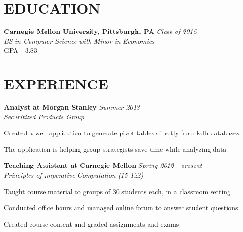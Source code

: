 \documentclass[margin, 11pt]{res} %
\begin{document}
\begin{resume}


\section{EDUCATION}

{\bf Carnegie Mellon University, Pittsburgh, PA} \hfill {\sl Class of 2015}\\
{\sl BS in Computer Science with Minor in Economics } \\
{\small GPA - 3.83}



\section{EXPERIENCE}

{\bf Analyst at Morgan Stanley} \hfill {\sl Summer 2013} \\
{\sl Securitized Products Group}

\begin{itemize} \itemsep -2pt %
{\small \item Created a web application to generate pivot tables directly from kdb databases
\item The application is helping group strategists save time while analyzing data}
\end{itemize}

\vspace{3pt}

{\bf Teaching Assistant at Carnegie Mellon} \hfill {\sl Spring 2012 - present}\\
{\sl Principles of Imperative Computation (15-122)}
\begin{itemize} \itemsep -2pt
{\small \item Taught course material to groups of 30 students each, in a classroom setting

\item Conducted office hours and managed online forum to answer student questions

\item Created course content and graded assignments and exams}
\end{itemize}


\end{resume}
\end{document}
